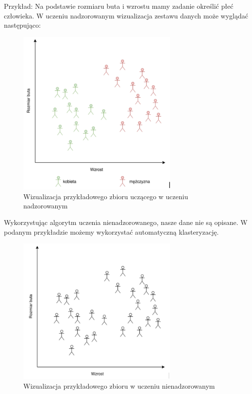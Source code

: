 Przykład: Na podstawie rozmiaru buta i wzrostu mamy zadanie określić płeć człowieka.
W uczeniu nadzorowanym wizualizacja zestawu danych może wyglądać następująco:

    \begin{figure}[H]
    \includegraphics[width=8cm]{supervised_dataset_example.png}
    \centering
    \caption{Wizualizacja przykładowego zbioru uczącego w uczeniu nadzorowanym}
    \end{figure}
    
Wykorzystując algorytm uczenia nienadzorowanego, nasze dane nie są opisane. W podanym przykładzie możemy wykorzystać automatyczną klasteryzację.

    \begin{figure}[H]
    \includegraphics[width=8cm]{unsupervised_dataset_example.png}
    \centering
    \caption{Wizualizacja przykładowego zbioru w uczeniu nienadzorowanym}
    \end{figure}
    

